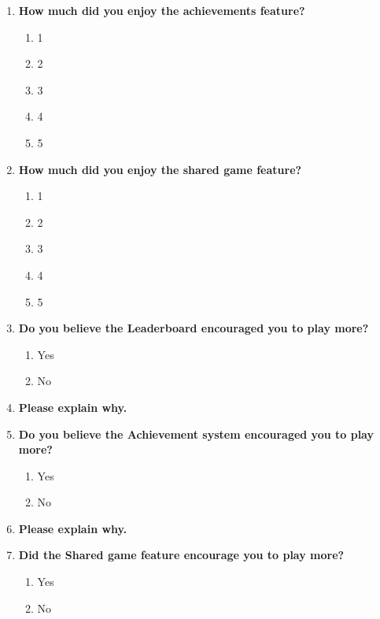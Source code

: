 \begin{enumerate}
    \item \textbf{How much did you enjoy the achievements feature?}
    \begin{enumerate}[label=(\arabic*)]
        \item 1
        \item 2
        \item 3
        \item 4
        \item 5
    \end{enumerate}

    \item \textbf{How much did you enjoy the shared game feature?}
    \begin{enumerate}[label=(\arabic*)]
        \item 1
        \item 2
        \item 3
        \item 4
        \item 5
    \end{enumerate}

    \item \textbf{Do you believe the Leaderboard encouraged you to play more?}
    \begin{enumerate}[label=(\arabic*)]
        \item Yes
        \item No
    \end{enumerate}

    \item \textbf{Please explain why.}
    \vspace{2cm}
    \hrulefill

    \item \textbf{Do you believe the Achievement system encouraged you to play more?}
    \begin{enumerate}[label=(\arabic*)]
        \item Yes
        \item No
    \end{enumerate}

    \item \textbf{Please explain why.}
    \vspace{2cm}
    \hrulefill

    \item \textbf{Did the Shared game feature encourage you to play more?}
    \begin{enumerate}[label=(\arabic*)]
        \item Yes
        \item No
    \end{enumerate}


\end{enumerate}

